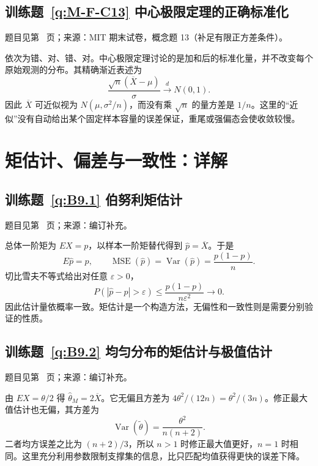 \documentclass[UTF8,12pt,a4paper,fontset=fandol]{ctexbook}
\begin{document}
\subsection*{训练题~\ref{q:M-F-C13} 中心极限定理的正确标准化}\label{a:M-F-C13}{\small 题目见第~\pageref{q:M-F-C13} 页；来源：MIT 期末试卷，概念题 13（补足有限正方差条件）。}
\begin{solve}依次为错、对、错、对。中心极限定理讨论的是加和后的标准化量，并不改变每个原始观测的分布。其精确渐近表述为\[\frac{\sqrt n(\overline X-\mu)}{\sigma}\xrightarrow{d}N(0,1).\]因此 $\overline X$ 可近似视为 $N(\mu,\sigma^2/n)$，而没有乘 $\sqrt n$ 的量方差是 $1/n$。这里的“近似”没有自动给出某个固定样本容量的误差保证，重尾或强偏态会使收敛较慢。\end{solve}

\clearpage\section*{矩估计、偏差与一致性：详解}

\subsection*{训练题~\ref{q:B9.1} 伯努利矩估计}\label{a:B9.1}{\small 题目见第~\pageref{q:B9.1} 页；来源：编订补充。}
\begin{solve}总体一阶矩为 $EX=p$，以样本一阶矩替代得到 $\widehat p=\overline X$。于是\[E\widehat p=p,\qquad\operatorname{MSE}(\widehat p)=\operatorname{Var}(\widehat p)=\frac{p(1-p)}n.\]切比雪夫不等式给出对任意 $\varepsilon>0$，\[P(|\widehat p-p|>\varepsilon)\le\frac{p(1-p)}{n\varepsilon^2}\longrightarrow0.\]因此估计量依概率一致。矩估计是一个构造方法，无偏性和一致性则是需要分别验证的性质。\end{solve}

\subsection*{训练题~\ref{q:B9.2} 均匀分布的矩估计与极值估计}\label{a:B9.2}{\small 题目见第~\pageref{q:B9.2} 页；来源：编订补充。}
\begin{solve}由 $EX=\theta/2$ 得 $\widehat\theta_M=2\overline X$。它无偏且方差为 $4\theta^2/(12n)=\theta^2/(3n)$。修正最大值估计也无偏，其方差为\[\operatorname{Var}(\widetilde\theta)=\frac{\theta^2}{n(n+2)}.\]二者均方误差之比为 $(n+2)/3$，所以 $n>1$ 时修正最大值更好，$n=1$ 时相同。这里充分利用参数限制支撑集的信息，比只匹配均值获得更快的误差下降。\end{solve}
\end{document}
